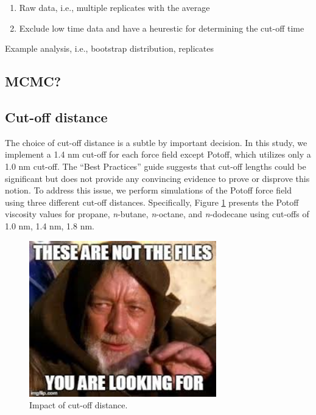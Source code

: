 \documentclass[preprint,review,12pt]{elsarticle}
\begin{document}
	
	\begin{enumerate}
		\item Raw data, i.e., multiple replicates with the average
		\item Exclude low time data and have a heurestic for determining the cut-off time
	\end{enumerate}
	
	Example analysis, i.e., bootstrap distribution, replicates
	
	\subsection{MCMC?}
	
    \subsection{Cut-off distance}
    
    The choice of cut-off distance is a subtle by important decision. In this study, we implement a 1.4 nm cut-off for each force field except Potoff, which utilizes only a 1.0 nm cut-off. The ``Best Practices'' guide suggests that cut-off lengths could be significant but does not provide any convincing evidence to prove or disprove this notion. To address this issue, we perform simulations of the Potoff force field using three different cut-off distances. Specifically, Figure \ref{fig:cutoff_distance} presents the Potoff viscosity values for propane, \textit{n}-butane, \textit{n}-octane, and \textit{n}-dodecane using cut-offs of 1.0 nm, 1.4 nm, 1.8 nm. 

	\begin{figure}[htb!]
		\centering
		\includegraphics[width=3.2in]{empty_figure.jpg}
		\caption{Impact of cut-off distance.}
		\label{fig:cutoff_distance}
	\end{figure} 
	
\end{document}
